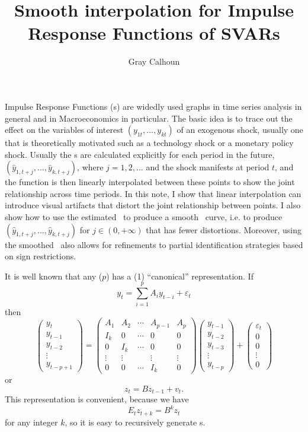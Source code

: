 \documentclass[12pt,fleqn]{article}
\title{Smooth interpolation for Impulse Response Functions of SVARs}
\author{Gray Calhoun}
\newcommand{\vep}{\varepsilon}
\begin{document}
\maketitle

Impulse Response Functions (\IRF s) are widedly used graphs in time
series analysis in general and in Macroeconomics in particular. The
basic idea is to trace out the effect on the variables of interest
$(y_{1t},\dots,y_{kt})$ of an exogenous shock, usually one that is
theoretically motivated such as a technology shock or a monetary
policy shock. Usually the \IRF s are calculated explicitly for each
period in the future, $(\hat y_{1,t+j},\dots,\hat y_{k,t+j})$, where
$j = 1, 2, \dots$ and the shock manifests at period $t$, and the
function is then linearly interpolated between these points to show
the joint relationship across time periods. In this note, I show that
linear interpolation can introduce visual artifacts that distort the
joint relationship between points. I also show how to use the
estimated \VAR\ to produce a smooth \IRF\ curve, i.e. to produce
$(\hat y_{1,t+j},\dots,\hat y_{k,t+j})$ for $j \in (0,+\infty)$ that
has fewer distortions. Moreover, using the smoothed \IRF\ also allows
for refinements to partial identification strategies based on sign
restrictions.

It is well known that any \VAR($p$) has a \VAR(1) ``canonical''
representation. If
\[
y_t = \sum_{i=1}^p A_i y_{t-i} + \vep_t
\]
then
\[
\begin{pmatrix}
  y_t \\ y_{t-1} \\ y_{t-2} \\ \vdots \\ y_{t-p+1}
\end{pmatrix}
=
\begin{pmatrix}
  A_1 & A_2 & \cdots & A_{p-1} & A_p \\
  I_k & 0   & \cdots & 0 & 0 \\
  0  & I_k  & \cdots & 0 & 0 \\
  \vdots & \vdots & & \vdots & \vdots \\
  0 & 0 & \cdots & I_k & 0 
\end{pmatrix}
\begin{pmatrix}
  y_{t-1} \\ y_{t-2} \\ y_{t-3} \\ \vdots \\ y_{t-p}
\end{pmatrix}
+
\begin{pmatrix}
  \vep_{t} \\ 0 \\ 0 \\ \vdots \\ 0
\end{pmatrix}
\]
or
\[
z_t = B z_{t-1} + v_t.
\]
This representation is convenient, because we have
\[
E_t z_{t+k} = B^k z_{t}
\]
for any integer $k$, so it is easy to recursively generate \IRF s.
\end{document}
